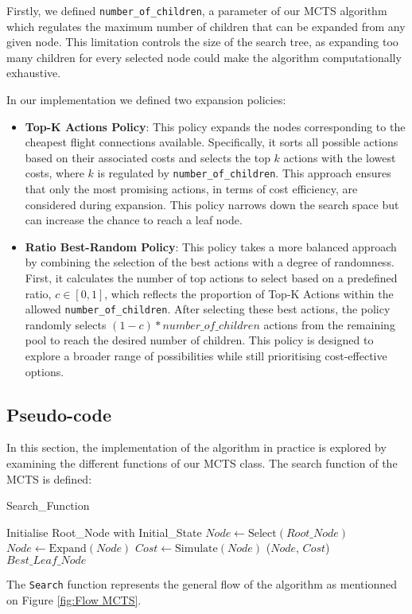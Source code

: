 Firstly, we defined \texttt{number\_of\_children}, a parameter of our MCTS algorithm which regulates the maximum number of children that can be expanded from any given node. This limitation controls the size of the search tree, as expanding too many children for every selected node could make the algorithm computationally exhaustive.

In our implementation we defined two expansion policies:

\begin{itemize}
    \item \textbf{Top-K Actions Policy}: This policy expands the nodes corresponding to the cheapest flight connections available. Specifically, it sorts all possible actions based on their associated costs and selects the top \(k\) actions with the lowest costs, where \(k\) is regulated by \texttt{number\_of\_children}. This approach ensures that only the most promising actions, in terms of cost efficiency, are considered during expansion. This policy narrows down the search space but can increase the chance to reach a leaf node.
    \item \textbf{Ratio Best-Random Policy}: This policy takes a more balanced approach by combining the selection of the best actions with a degree of randomness. First, it calculates the number of top actions to select based on a predefined ratio, \(c \in [0,1]\), which reflects the proportion of Top-K Actions within the allowed \texttt{number\_of\_children}. After selecting these best actions, the policy randomly selects $(1-c)*number\_of\_children$ actions from the remaining pool to reach the desired number of children. This policy is designed to explore a broader range of possibilities while still prioritising cost-effective options.
\end{itemize}


\subsection{Pseudo-code}
In this section, the implementation of the algorithm in practice is explored by examining the different functions of our MCTS class. The search function of the MCTS is defined:

\begin{algorithm}[H]
    \caption{Search\_Function}
    \label{alg:MCTS}
    \begin{algorithmic}[1]
        \STATE Initialise Root\_Node with Initial\_State
        \STATE $Node \leftarrow \text{Select}(Root\_Node)$
        \STATE $Node \leftarrow \text{Expand}(Node)$
        \ENDIF
        \STATE $Cost \leftarrow \text{Simulate}(Node)$
        \STATE {}($Node$, $Cost$)
        \ENDWHILE
        \RETURN $Best\_Leaf\_Node$
    \end{algorithmic}
\end{algorithm}
The \texttt{Search} function represents the general flow of the algorithm as mentionned on Figure \ref{fig:Flow MCTS}.


